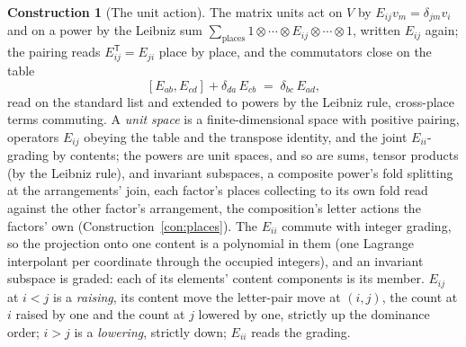 \documentclass[11pt]{article}
\theoremstyle{definition}
\newtheorem{construction}{Construction}
\begin{document}
\begin{construction}[The unit action]\label{con:units}
The matrix units act on $V$ by $E_{ij}v_m=\delta_{jm}v_i$ and on a power
by the Leibniz sum $\sum_{\text{places}}1\otimes\cdots\otimes
E_{ij}\otimes\cdots\otimes1$, written $E_{ij}$ again; the pairing reads
$E_{ij}^{\mathsf T}=E_{ji}$ place by place, and the commutators close on
the table
\[
[E_{ab},E_{cd}]+\delta_{da}\,E_{cb}\;=\;\delta_{bc}\,E_{ad} ,
\]
read on the standard list and extended to powers by the Leibniz rule,
cross-place terms commuting. A \emph{unit space} is a finite-dimensional
space with positive pairing, operators $E_{ij}$ obeying the table and the
transpose identity, and the joint $E_{ii}$-grading by contents; the powers are
unit spaces, and so are sums, tensor products (by the Leibniz rule),
and invariant subspaces, a composite power's fold splitting at the
arrangements' join, each factor's places collecting to its own fold
read against the other factor's arrangement, the composition's
letter actions the factors' own
(Construction~\ref{con:places}). The $E_{ii}$ commute with integer grading, so
the projection onto one content is a polynomial in them (one Lagrange
interpolant per coordinate through the occupied integers), and an
invariant subspace is graded: each of its elements' content
components is its member. $E_{ij}$ at $i<j$ is a \emph{raising}, its
content move the letter-pair move at $(i,j)$, the count at $i$ raised
by one and the count at $j$ lowered by one, strictly up the dominance
order; $i>j$ is a \emph{lowering}, strictly down; $E_{ii}$ reads the
grading.
\end{construction}
\end{document}
